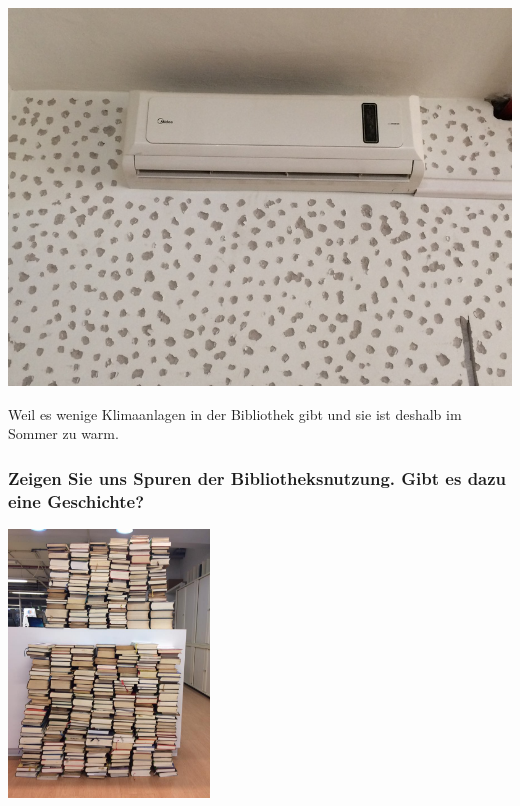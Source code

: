 \begin{center}
\includegraphics{gi-porto-alegre/img/ar.jpg}
\end{center}

Weil es wenige Klimaanlagen in der Bibliothek gibt und sie ist deshalb
im Sommer zu warm.

\hypertarget{zeigen-sie-uns-spuren-der-bibliotheksnutzung.-gibt-es-dazu-eine-geschichte}{%
\subsubsection*{Zeigen Sie uns Spuren der Bibliotheksnutzung. Gibt es dazu eine
Geschichte?}\label{zeigen-sie-uns-spuren-der-bibliotheksnutzung.-gibt-es-dazu-eine-geschichte}}

\begin{center}
\includegraphics[width=0.4\textwidth]{gi-porto-alegre/img/descarte.jpg}
\end{center}

